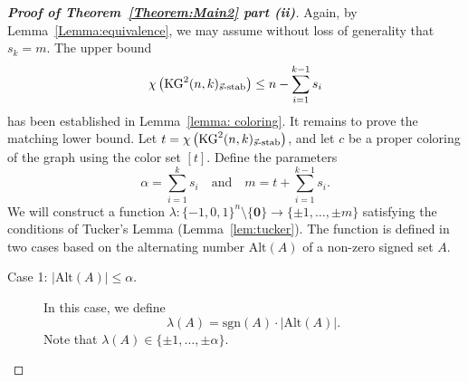 \documentclass[preprint,12pt,3p]{elsarticle}
\begin{document}
\begin{proof}[\textbf{Proof of Theorem~\ref{Theorem:Main2} part (ii)}]
Again, by Lemma~\ref{Lemma:equivalence}, we may assume without loss of generality that $s_k = m$. The upper bound
\[
\chi\left(\mathrm{KG}^{2}(n, k)_{\vec{s}\textup{-stab}}\right) \leq n - \sum_{i=1}^{k-1} s_i
\]
has been established in Lemma~\ref{lemma: coloring}. It remains to prove the matching lower bound. Let $t = \chi\left(\mathrm{KG}^{2}(n, k)_{\vec{s}\textup{-stab}}\right)$, and let $c$ be a proper coloring of the graph using the color set $[t]$. Define the parameters
\[
\alpha = \sum_{i=1}^{k} s_i \quad \text{and} \quad m = t + \sum_{i=1}^{k-1} s_i.
\]
We will construct a function $\lambda : \{-1, 0, 1\}^n \setminus \{\mathbf{0}\} \to \{\pm 1, \dots, \pm m\}$ satisfying the conditions of Tucker's Lemma (Lemma~\ref{lem:tucker}). The function is defined in two cases based on the alternating number $\mathrm{Alt}(A)$ of a non-zero signed set $A$.

\begin{description}
    \item[Case 1: $|\mathrm{Alt}(A)| \leq \alpha$.] 
        In this case, we define
        \[
        \lambda(A) = \mathrm{sgn}(A) \cdot |\mathrm{Alt}(A)|.
        \]
        Note that $\lambda(A) \in \{\pm 1, \dots, \pm \alpha\}$.


\end{description}
\end{proof}
\end{document}
